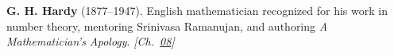 \textbf{G. H. Hardy} (1877–1947). English mathematician recognized for his work in number theory, mentoring Srinivasa Ramanujan, and authoring \emph{A Mathematician's Apology}. \emph{[Ch.~\hyperref[ch:boundedprimegaps]{08}]}

